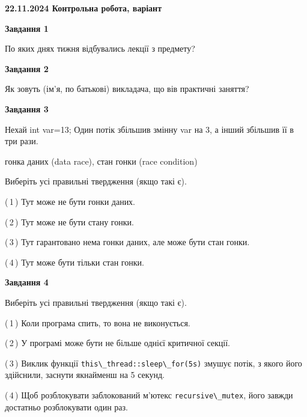 \documentclass[12pt, ukrainian]{article}
\def\code#1{\Verb!#1!}
\begin{document}
\begin {large}

\textbf{22.11.2024 Контрольна робота, варіант  }\par


{

\begin{center}
\textbf{Завдання 1}
\end{center}

По яких днях тижня відбувались лекції з предмету?


\begin{center}
\textbf{Завдання 2}
\end{center}

Як зовуть (ім'я, по батькові) викладача, що вів практичні заняття?


\begin{center}
\textbf{Завдання 3}
\end{center}

Нехай int var=13; Один потік збільшив змінну var на 3, а інший збільшив її в три рази.

гонка даних (data race), стан гонки (race condition)

Виберіть усі правильні твердження (якщо такі є).\par
\vspace{2mm}
(\,1\,) Тут може не бути гонки даних.%

(\,2\,) Тут може не бути стану гонки.%

(\,3\,) Тут гарантовано нема гонки даних, але може бути стан гонки.%

(\,4\,) Тут може бути тільки стан гонки.%


\begin{center}
\textbf{Завдання 4}
\end{center}

Виберіть усі правильні твердження (якщо такі є).\par
\vspace{2mm}

(\,1\,) Коли програма спить, то вона не виконується.%

(\,2\,) У програмі може бути не більше однієї критичної секції.%

(\,3\,) Виклик функції \code{this\_thread::sleep\_for(5s)} змушує потік, з якого його здійснили, заснути якнайменш на 5 секунд.%

(\,4\,) Щоб розблокувати заблокований м’ютекс \code{recursive\_mutex}, його завжди достатньо розблокувати один раз.%


}
\end{large}
\end{document}
